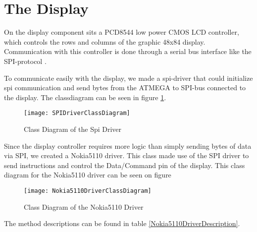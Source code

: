 \section{The Display}
\label{DisplaySection}
On the display component sits a PCD8544 low power CMOS LCD controller, which controls the rows and columns of the graphic 48x84 display. Communication with this controller is done through a serial bus interface like the SPI-protocol \cite{NokiaDisplay}.


To communicate easily with the display, we made a spi-driver that could initialize spi communication and send bytes from the ATMEGA to SPI-bus connected to the display. The classdiagram can be seen in figure \ref{SpiDriverClassDiagram}.

\begin{figure}[H]
	\texttt{[image: SPIDriverClassDiagram]}
	\centering
	\caption{Class Diagram of the Spi Driver}
	\label{SpiDriverClassDiagram}
\end{figure}

Since the display controller requires more logic than simply sending bytes of data via SPI, we created a Nokia5110 driver. This class made use of the SPI driver to send instructions and control the Data/Command pin of the display. This class diagram for the Nokia5110 driver can be seen on figure 

\begin{figure}[H]
	\texttt{[image: Nokia5110DriverClassDiagram]}
	\centering
	\caption{Class Diagram of the Nokia5110 Driver}
	\label{Nokia5110DriverClassDiagram}
\end{figure}

The method descriptions can be found in table \ref{Nokia5110DriverDescription}.

